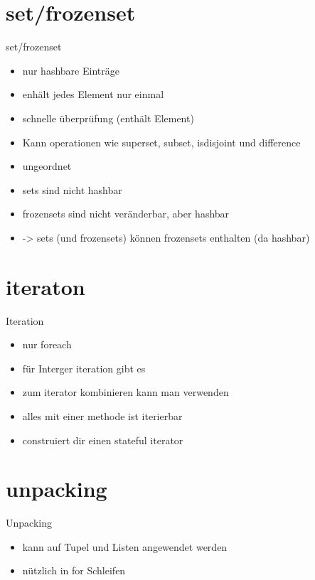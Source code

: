 \section{set/frozenset}
\begin{frame}{set/frozenset}
\begin{itemize}
	\item nur hashbare Einträge
	\item enhält jedes Element nur einmal
	\item schnelle  überprüfung (enthält Element)
	\item Kann operationen wie superset, subset, isdisjoint und difference 
	\item ungeordnet
	\item sets sind nicht hashbar
	\item frozensets sind nicht veränderbar, aber hashbar
	\item -> sets (und frozensets) können frozensets enthalten (da hashbar)
\end{itemize}
\end{frame}
\begin{frame}{}
	
\end{frame}

\section{iteraton}
\begin{frame}{Iteration}
\begin{itemize}
	\item nur foreach
	\item für Interger iteration gibt es 
	\item zum iterator kombinieren kann man  verwenden
	\item alles mit einer  methode ist iterierbar
	\item {} construiert dir einen stateful iterator
\end{itemize}
\end{frame}
\begin{frame}{}
	
\end{frame}

\section{unpacking}
\begin{frame}{Unpacking}
\begin{itemize}
	\item kann auf Tupel und Listen angewendet werden
	\item nützlich in for Schleifen
\end{itemize}
\end{frame}
\begin{frame}{}
	
\end{frame}

